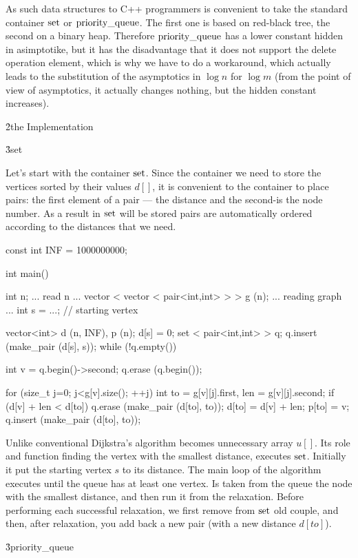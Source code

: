 As such data structures to C++ programmers is convenient to take the standard container $\rm set$ or $\rm priority\_queue$. The first one is based on red-black tree, the second on a binary heap. Therefore $\rm priority\_queue$ has a lower constant hidden in asimptotike, but it has the disadvantage that it does not support the delete operation element, which is why we have to do a workaround, which actually leads to the substitution of the asymptotics in $\log n$ for $\log m$ (from the point of view of asymptotics, it actually changes nothing, but the hidden constant increases).

\h2{the Implementation}

\h3{set}

Let's start with the container $\rm set$. Since the container we need to store the vertices sorted by their values $d[]$, it is convenient to the container to place pairs: the first element of a pair --- the distance and the second-is the node number. As a result in $\rm set$ will be stored pairs are automatically ordered according to the distances that we need.

\code
const int INF = 1000000000;

int main() {
int n;
... read n ...
vector < vector < pair<int,int> > > g (n);
... reading graph ...
int s = ...; // starting vertex

vector<int> d (n, INF), p (n);
d[s] = 0;
set < pair<int,int> > q;
q.insert (make_pair (d[s], s));
while (!q.empty()) {
int v = q.begin()->second;
q.erase (q.begin());

for (size_t j=0; j<g[v].size(); ++j) {
int to = g[v][j].first,
len = g[v][j].second;
if (d[v] + len < d[to]) {
q.erase (make_pair (d[to], to));
d[to] = d[v] + len;
p[to] = v;
q.insert (make_pair (d[to], to));
}
}
}
}
\endcode

Unlike conventional Dijkstra's algorithm becomes unnecessary array $u[]$. Its role and function finding the vertex with the smallest distance, executes $\rm set$. Initially it put the starting vertex $s$ to its distance. The main loop of the algorithm executes until the queue has at least one vertex. Is taken from the queue the node with the smallest distance, and then run it from the relaxation. Before performing each successful relaxation, we first remove from $\rm set$ old couple, and then, after relaxation, you add back a new pair (with a new distance $d[to]$).

\h3{priority_queue}


